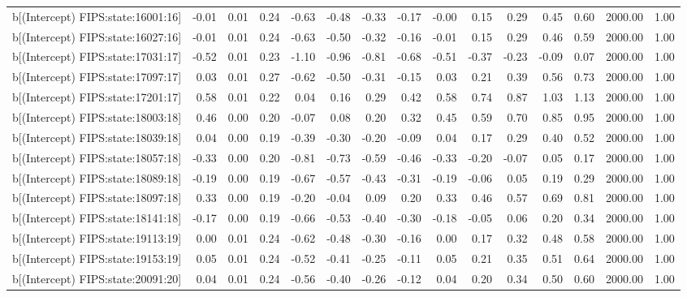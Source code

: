 \begin{table}[ht]
\begin{tabular}{rrrrrrrrrrrrrrr}
  b[(Intercept) FIPS:state:16001:16] & -0.01 & 0.01 & 0.24 & -0.63 & -0.48 & -0.33 & -0.17 & -0.00 & 0.15 & 0.29 & 0.45 & 0.60 & 2000.00 & 1.00 \\ 
  b[(Intercept) FIPS:state:16027:16] & -0.01 & 0.01 & 0.24 & -0.63 & -0.50 & -0.32 & -0.16 & -0.01 & 0.15 & 0.29 & 0.46 & 0.59 & 2000.00 & 1.00 \\ 
  b[(Intercept) FIPS:state:17031:17] & -0.52 & 0.01 & 0.23 & -1.10 & -0.96 & -0.81 & -0.68 & -0.51 & -0.37 & -0.23 & -0.09 & 0.07 & 2000.00 & 1.00 \\ 
  b[(Intercept) FIPS:state:17097:17] & 0.03 & 0.01 & 0.27 & -0.62 & -0.50 & -0.31 & -0.15 & 0.03 & 0.21 & 0.39 & 0.56 & 0.73 & 2000.00 & 1.00 \\ 
  b[(Intercept) FIPS:state:17201:17] & 0.58 & 0.01 & 0.22 & 0.04 & 0.16 & 0.29 & 0.42 & 0.58 & 0.74 & 0.87 & 1.03 & 1.13 & 2000.00 & 1.00 \\ 
  b[(Intercept) FIPS:state:18003:18] & 0.46 & 0.00 & 0.20 & -0.07 & 0.08 & 0.20 & 0.32 & 0.45 & 0.59 & 0.70 & 0.85 & 0.95 & 2000.00 & 1.00 \\ 
  b[(Intercept) FIPS:state:18039:18] & 0.04 & 0.00 & 0.19 & -0.39 & -0.30 & -0.20 & -0.09 & 0.04 & 0.17 & 0.29 & 0.40 & 0.52 & 2000.00 & 1.00 \\ 
  b[(Intercept) FIPS:state:18057:18] & -0.33 & 0.00 & 0.20 & -0.81 & -0.73 & -0.59 & -0.46 & -0.33 & -0.20 & -0.07 & 0.05 & 0.17 & 2000.00 & 1.00 \\ 
  b[(Intercept) FIPS:state:18089:18] & -0.19 & 0.00 & 0.19 & -0.67 & -0.57 & -0.43 & -0.31 & -0.19 & -0.06 & 0.05 & 0.19 & 0.29 & 2000.00 & 1.00 \\ 
  b[(Intercept) FIPS:state:18097:18] & 0.33 & 0.00 & 0.19 & -0.20 & -0.04 & 0.09 & 0.20 & 0.33 & 0.46 & 0.57 & 0.69 & 0.81 & 2000.00 & 1.00 \\ 
  b[(Intercept) FIPS:state:18141:18] & -0.17 & 0.00 & 0.19 & -0.66 & -0.53 & -0.40 & -0.30 & -0.18 & -0.05 & 0.06 & 0.20 & 0.34 & 2000.00 & 1.00 \\ 
  b[(Intercept) FIPS:state:19113:19] & 0.00 & 0.01 & 0.24 & -0.62 & -0.48 & -0.30 & -0.16 & 0.00 & 0.17 & 0.32 & 0.48 & 0.58 & 2000.00 & 1.00 \\ 
  b[(Intercept) FIPS:state:19153:19] & 0.05 & 0.01 & 0.24 & -0.52 & -0.41 & -0.25 & -0.11 & 0.05 & 0.21 & 0.35 & 0.51 & 0.64 & 2000.00 & 1.00 \\ 
  b[(Intercept) FIPS:state:20091:20] & 0.04 & 0.01 & 0.24 & -0.56 & -0.40 & -0.26 & -0.12 & 0.04 & 0.20 & 0.34 & 0.50 & 0.60 & 2000.00 & 1.00 \\ 

\end{tabular}
\end{table}
